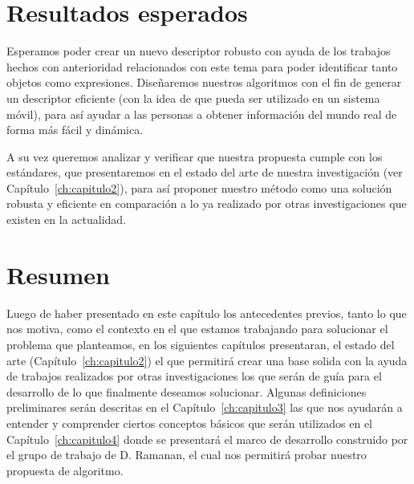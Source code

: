 \section{Resultados esperados}
Esperamos poder crear un nuevo descriptor robusto con ayuda de los trabajos hechos con anterioridad relacionados con este tema para poder identificar tanto objetos como expresiones. Diseñaremos nuestros algoritmos con el fin de generar un descriptor eficiente (con la idea de que pueda ser utilizado en un sistema móvil), para así ayudar a las personas a obtener información del mundo real de forma más fácil y dinámica.

A su vez queremos analizar y verificar que nuestra propuesta cumple con los estándares, que presentaremos en el estado del arte de nuestra investigación (ver Capítulo~\ref{ch:capitulo2}), para así proponer nuestro método como una solución robusta y eficiente en comparación a lo ya realizado por otras investigaciones que existen en la actualidad.

\section{Resumen}

Luego de haber presentado en este capítulo los antecedentes previos, tanto lo que nos motiva, como el contexto en el que estamos trabajando para solucionar el problema que planteamos, en los siguientes capítulos presentaran, el estado del arte (Capítulo~\ref{ch:capitulo2}) el que permitirá crear una base solida con la ayuda de trabajos realizados por otras investigaciones los que serán de guía para el desarrollo de lo que finalmente deseamos solucionar. Algunas definiciones preliminares serán descritas en el Capítulo~\ref{ch:capitulo3} las que nos ayudarán a entender y comprender ciertos conceptos básicos que serán utilizados en el Capítulo~\ref{ch:capitulo4} donde se presentará el marco de desarrollo construido por el grupo de trabajo de D. Ramanan, el cual nos permitirá probar nuestro propuesta de algoritmo. %